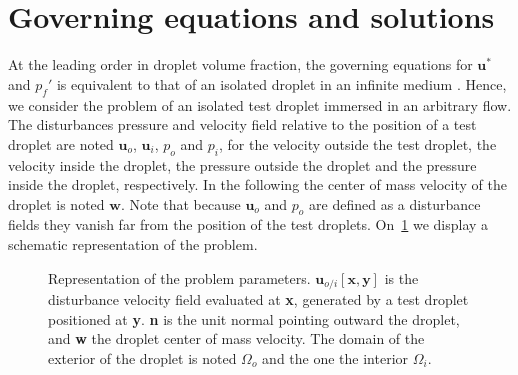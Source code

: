 



\section{Governing equations and solutions}


At the leading order in droplet volume fraction, the governing equations for $\textbf{u}^*$ and $p_f'$ is equivalent to that of an isolated droplet in an infinite medium \citet{hinch1977averaged}. 
Hence, we consider the problem of an isolated test droplet immersed in an arbitrary flow. 
The disturbances pressure and velocity field relative to the position of a test droplet are noted $\textbf{u}_{o}$, $\textbf{u}_{i}$, $p_{o}$ and $p_{i}$, for the velocity outside the test droplet, the velocity inside the droplet, the pressure outside the droplet and the pressure inside the droplet, respectively. 
In the following the center of mass velocity of the droplet is noted $\textbf{w}$. 
Note that because $\textbf{u}_o$ and $p_o$ are defined as a disturbance fields they vanish far from the position of the test droplets. 
On~\ref{fig:disturbance} we display a schematic representation of the problem. 
\begin{figure}[h!]
    \centering
    \caption{Representation of the problem parameters. $\textbf{u}_{o/i}[\textbf{x},\textbf{y}]$ is the disturbance velocity field evaluated at \textbf{x}, generated by a test droplet positioned at \textbf{y}. \textbf{n} is the unit normal  pointing outward the droplet, and \textbf{w} the droplet center of mass velocity. 
    The domain of the exterior of the droplet is noted $\Omega_o$ and the one the interior $\Omega_i$.}
    \label{fig:disturbance}
\end{figure}

